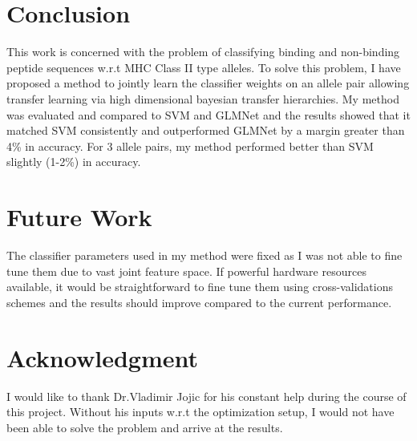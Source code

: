 \documentclass[conference,10pt,draftclsnofoot,onecolumn]{IEEEtran}
\begin{document}
\section{Conclusion}
\label{sec:conclusion}
This work is concerned with the problem of classifying binding and non-binding peptide sequences w.r.t MHC Class II type alleles.
To solve this problem, I have proposed a method to jointly learn the classifier weights on an allele pair allowing transfer learning
via high dimensional bayesian transfer hierarchies. My method was evaluated and compared to SVM and GLMNet and the results showed that
it matched SVM consistently and outperformed GLMNet by a margin greater than 4\% in accuracy. For 3 allele pairs, my method performed better
than SVM slightly (1-2\%) in accuracy.

\section{Future Work}
\label{sec:futureWork}
The classifier parameters used in my method were fixed as I was not able to fine tune them due to vast joint feature space. If powerful hardware resources available,
it would be straightforward to fine tune them using cross-validations schemes and the results should improve compared to the current performance.

\section*{Acknowledgment}
I would like to thank Dr.Vladimir Jojic for his constant help during the course of this project. Without his inputs w.r.t the optimization setup, I would not have been able to solve the problem and arrive at the results.



%
%
%
{}


\end{document}
